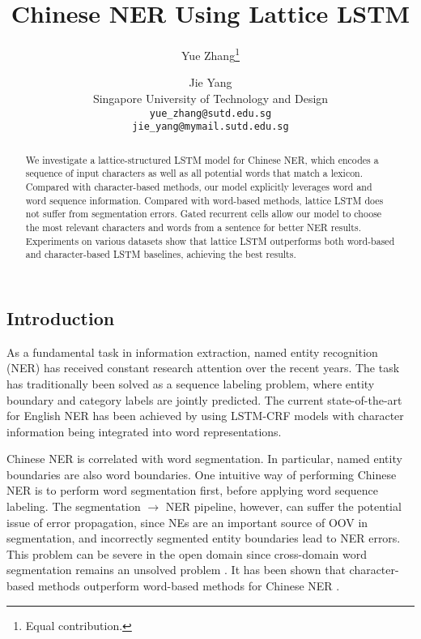 \documentclass[11pt,a4paper]{article}
\title{Chinese NER Using Lattice LSTM}
\author{Yue Zhang\thanks{\quad Equal contribution.} \and Jie Yang\samethanks\\ 
  Singapore University of Technology and Design \\
  {\tt yue\_zhang@sutd.edu.sg} \\
  {\tt jie\_yang@mymail.sutd.edu.sg} \\}
\date{}
\begin{document}
\begin{CJK*}{UTF8}{gbsn}
\maketitle
\begin{abstract}
We investigate a lattice-structured LSTM model for Chinese NER, which encodes a sequence of input characters as well as all potential words that match a lexicon. Compared with character-based methods, our model explicitly leverages word and word sequence information. Compared with word-based methods, lattice LSTM does not suffer from segmentation errors. Gated recurrent cells allow our model to choose the most relevant characters and words from a sentence for better NER results. Experiments on various datasets show that lattice LSTM outperforms both word-based and character-based LSTM baselines, achieving the best results. 
\end{abstract}


\section{Introduction}

As a fundamental task in information extraction, named entity recognition (NER) has received constant research attention over the recent years. The task has traditionally been solved as a sequence labeling problem, where entity boundary and category labels are jointly predicted. The current state-of-the-art for English NER has been achieved by using LSTM-CRF models \cite{lample2016neural,ma2016end,chiu2015named,liu2017empower} with character information being integrated into word representations. 


Chinese NER is correlated with word segmentation. In particular, named entity boundaries are also word boundaries. One intuitive way of performing Chinese NER is to perform word segmentation first, before applying word sequence labeling. The segmentation $\rightarrow$ NER pipeline, however, can suffer the potential issue of error propagation, since NEs are an important source of OOV in segmentation, and incorrectly segmented entity boundaries lead to NER errors. This problem can be severe in the open domain since cross-domain word segmentation remains an unsolved problem \cite{liu2012unsupervised,jiang2013discriminative,liu2014domain,qiu2015word,chen2017adversarial,huang2017addressing}. 
It has been shown that character-based methods outperform word-based methods for Chinese NER \cite{he2008chinese,liu2010chinese,li2014comparison}. 



\end{CJK*}
\end{document}
